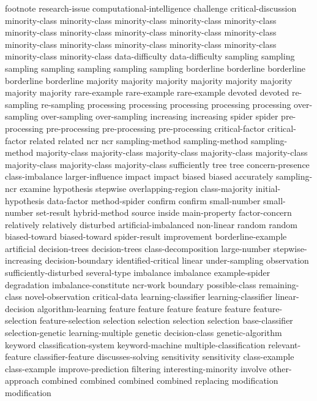 footnote	
research-issue	
computational-intelligence	
challenge	
critical-discussion	
minority-class	minority-class	minority-class	minority-class	minority-class	minority-class	minority-class	minority-class	minority-class	minority-class	minority-class	minority-class	minority-class	minority-class	minority-class	minority-class	minority-class	
data-difficulty	data-difficulty	
sampling	sampling	sampling	sampling	sampling	sampling	sampling	
borderline	borderline	borderline	borderline	borderline	
majority	majority	majority	majority	majority	majority	majority	majority	
rare-example	rare-example	rare-example	
devoted	devoted	
re-sampling	re-sampling	
processing	processing	processing	processing	processing	
over-sampling	over-sampling	over-sampling	
increasing	increasing	
spider	spider	
pre-processing	pre-processing	pre-processing	pre-processing	
critical-factor	critical-factor	
related	related	
ncr	ncr	
sampling-method	sampling-method	sampling-method	
majority-class	majority-class	majority-class	majority-class	majority-class	majority-class	majority-class	majority-class	
sufficiently	
tree	tree	
concern-presence	
class-imbalance	
larger-influence	
impact	impact	
biased	biased	
accurately	
sampling-ncr	
examine	
hypothesis	
stepwise	
overlapping-region	
class-majority	
initial-hypothesis	
data-factor	
method-spider	
confirm	confirm	
small-number	small-number	
set-result	
hybrid-method	
source	
inside	
main-property	
factor-concern	
relatively	relatively	
disturbed	
artificial-imbalanced	
non-linear	
random	random	
biased-toward	biased-toward	
spider-result	
improvement	
borderline-example	
artificial	
decision-trees	decision-trees	
class-decomposition	
large-number	
stepwise-increasing	
decision-boundary	
identified-critical	
linear	
under-sampling	
observation	
sufficiently-disturbed	
several-type	
imbalance	imbalance	
example-spider	
degradation	
imbalance-constitute	
ncr-work	
boundary	
possible-class	
remaining-class	
novel-observation	
critical-data	
learning-classifier	learning-classifier	
linear-decision	
algorithm-learning	
feature	feature	feature	feature	feature	
feature-selection	feature-selection	
selection	selection	selection	selection	
base-classifier	
selection-genetic	
learning-multiple	
genetic	
decision-class	
genetic-algorithm	
keyword	
classification-system	
keyword-machine	
multiple-classification	
relevant-feature	
classifier-feature	
discusses-solving	
sensitivity	sensitivity	
class-example	class-example	
improve-prediction	
filtering	
interesting-minority	
involve	
other-approach	
combined	combined	combined	combined	
replacing	
modification	modification	
